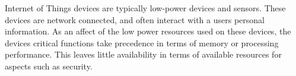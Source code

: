 Internet of Things devices are typically low-power devices and sensors. These
devices are network connected, and often interact with a users personal
information. As an affect of the low power resources used on these devices, the
devices critical functions take precedence in terms of memory or processing
performance. This leaves little availability in terms of available resources for
aspects such as security.

